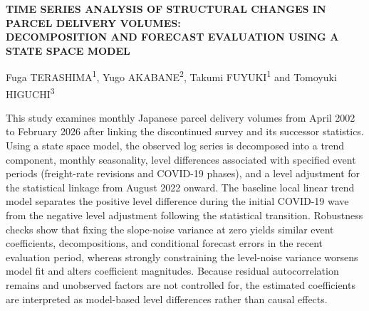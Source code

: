 \documentclass[uplatex,a4paper,10pt]{jsarticle}
\begin{document}
\vspace{8mm}
\begin{center}
\begin{minipage}{150mm}
\centering
{\bfseries\fontsize{12pt}{15pt}\selectfont
TIME SERIES ANALYSIS OF STRUCTURAL CHANGES IN PARCEL DELIVERY VOLUMES:\\
DECOMPOSITION AND FORECAST EVALUATION USING A STATE SPACE MODEL\par}
\vspace{\baselineskip}
{\fontsize{12pt}{15pt}\selectfont
Fuga TERASHIMA\textsuperscript{1}, Yugo AKABANE\textsuperscript{2}, Takumi FUYUKI\textsuperscript{1} and Tomoyuki HIGUCHI\textsuperscript{3}\par}
\vspace{\baselineskip}
{\fontsize{10pt}{13pt}\selectfont
\parbox{\linewidth}{\noindent This study examines monthly Japanese parcel delivery volumes from April 2002 to February 2026 after linking the discontinued survey and its successor statistics. Using a state space model, the observed log series is decomposed into a trend component, monthly seasonality, level differences associated with specified event periods (freight-rate revisions and COVID-19 phases), and a level adjustment for the statistical linkage from August 2022 onward. The baseline local linear trend model separates the positive level difference during the initial COVID-19 wave from the negative level adjustment following the statistical transition. Robustness checks show that fixing the slope-noise variance at zero yields similar event coefficients, decompositions, and conditional forecast errors in the recent evaluation period, whereas strongly constraining the level-noise variance worsens model fit and alters coefficient magnitudes. Because residual autocorrelation remains and unobserved factors are not controlled for, the estimated coefficients are interpreted as model-based level differences rather than causal effects.}\par}
\end{minipage}
\end{center}
\end{document}
